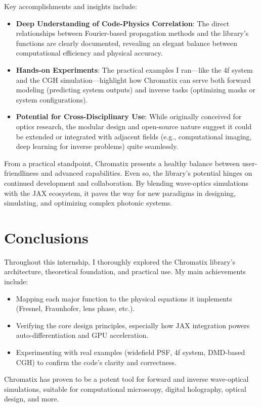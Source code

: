 \documentclass[a4paper,12pt]{report}
\begin{document}
Key accomplishments and insights include:
\begin{itemize}
    \item \textbf{Deep Understanding of Code-Physics Correlation}: The direct relationships between Fourier-based propagation methods and the library’s functions are clearly documented, revealing an elegant balance between computational efficiency and physical accuracy.
    \item \textbf{Hands-on Experiments}: The practical examples I ran—like the 4f system and the CGH simulation—highlight how Chromatix can serve both forward modeling (predicting system outputs) and inverse tasks (optimizing masks or system configurations).
    \item \textbf{Potential for Cross-Disciplinary Use}: While originally conceived for optics research, the modular design and open-source nature suggest it could be extended or integrated with adjacent fields (e.g., computational imaging, deep learning for inverse problems) quite seamlessly.
\end{itemize}

From a practical standpoint, Chromatix presents a healthy balance between user-friendliness and advanced capabilities. Even so, the library’s potential hinges on continued development and collaboration. By blending wave-optics simulations with the JAX ecosystem, it paves the way for new paradigms in designing, simulating, and optimizing complex photonic systems.


\section{Conclusions}
Throughout this internship, I thoroughly explored the Chromatix library’s architecture, theoretical foundation, and practical use. My main achievements include:
\begin{itemize}l
    \item Mapping each major function to the physical equations it implements (Fresnel, Fraunhofer, lens phase, etc.).
    \item Verifying the core design principles, especially how JAX integration powers auto-differentiation and GPU acceleration.
    \item Experimenting with real examples (widefield PSF, 4f system, DMD-based CGH) to confirm the code's clarity and correctness.
\end{itemize}
Chromatix has proven to be a potent tool for forward and inverse wave-optical simulations, suitable for computational microscopy, digital holography, optical design, and more.
\end{document}
